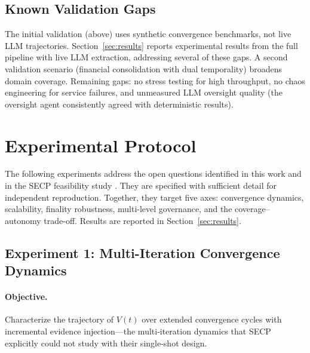 \documentclass[11pt]{article}
\begin{document}
\subsection{Known Validation Gaps}

The initial validation (above) uses synthetic convergence benchmarks, not live LLM trajectories. Section~\ref{sec:results} reports experimental results from the full pipeline with live LLM extraction, addressing several of these gaps. A second validation scenario (financial consolidation with dual temporality) broadens domain coverage. Remaining gaps: no stress testing for high throughput, no chaos engineering for service failures, and unmeasured LLM oversight quality (the oversight agent consistently agreed with deterministic results).

\section{Experimental Protocol}
\label{sec:proposed-experiments}

The following experiments address the open questions identified in this work and in the SECP feasibility study \cite{delachica2026}. They are specified with sufficient detail for independent reproduction. Together, they target five axes: convergence dynamics, scalability, finality robustness, multi-level governance, and the coverage--autonomy trade-off. Results are reported in Section~\ref{sec:results}.

\subsection{Experiment 1: Multi-Iteration Convergence Dynamics}

\paragraph{Objective.} Characterize the trajectory of $V(t)$ over extended convergence cycles with incremental evidence injection---the multi-iteration dynamics that SECP \cite{delachica2026} explicitly could not study with their single-shot design.
\end{document}
